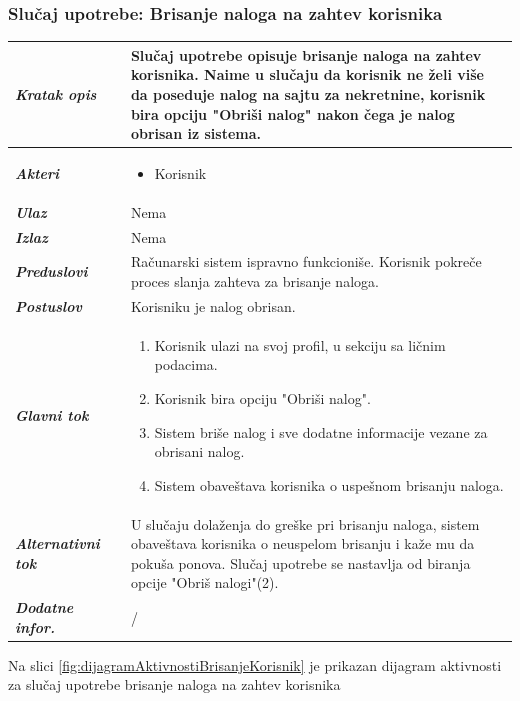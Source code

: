 \documentclass[20pt]{article}
\begin{document}
\subsubsection{\bfseries\large Slu\v{c}aj upotrebe: Brisanje naloga na zahtev korisnika}
\begin{center}
\begin{tabular}{p{0.23\linewidth} p{0.77\linewidth}}
\hline
 {\it \bfseries Kratak opis} & Slu\v {c}aj upotrebe opisuje brisanje naloga na zahtev korisnika. Naime u slu\v {c}aju da korisnik ne \v {z}eli vi\v {s}e da poseduje nalog na sajtu za nekretnine, korisnik bira opciju "Obri\v {s}i nalog" nakon \v {c}ega je nalog obrisan iz sistema.\\ 
 \hline
 {\it \bfseries Akteri} & \begin{itemize}
    \item Korisnik
\end{itemize}\\
\hline

 {\it \bfseries Ulaz} & Nema\\
 \hline
 
 {\it \bfseries Izlaz} & Nema\\
 \hline
 
 {\it \bfseries Preduslovi} & Ra\v {c}unarski sistem ispravno funkcioni\v {s}e. Korisnik pokre\v {c}e proces slanja zahteva za brisanje naloga.\\
 \hline
 
 {\it \bfseries Postuslov} & Korisniku je nalog obrisan.\\
 \hline

     {\it \bfseries Glavni tok} &  
     \begin{enumerate}
         \item Korisnik ulazi na svoj profil, u sekciju sa li\v {c}nim podacima.
         \item Korisnik bira opciju "Obri\v {s}i nalog".
         \item Sistem bri\v {s}e nalog i sve dodatne informacije vezane za obrisani nalog.
         \item Sistem obave\v {s}tava korisnika o uspe\v {s}nom brisanju naloga.
    \end{enumerate}\\
 \hline
 {\it \bfseries Alternativni tok} & U slu\v {c}aju dola\v {z}enja do gre\v {s}ke pri brisanju naloga, sistem obave\v {s}tava korisnika o neuspelom brisanju i ka\v {z}e mu da poku\v {s}a ponova. Slu\v {c}aj upotrebe se nastavlja od biranja opcije "Obri\v {s} nalogi"(2).\\
 \hline
 {\it \bfseries Dodatne infor.} & /\\
 \hline


\end{tabular}
\end{center}
\newpage
{}
\setlength{\parindent}{1cm}
\fontsize{13}{18} \selectfont 
Na slici \ref{fig:dijagramAktivnostiBrisanjeKorisnik} je prikazan dijagram aktivnosti za slu\v{c}aj upotrebe brisanje naloga na zahtev korisnika
\end{document}
